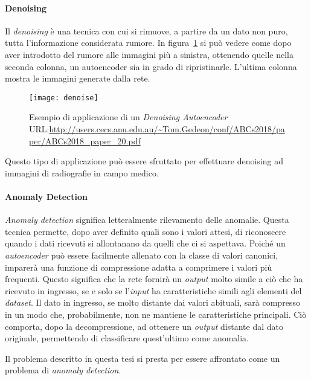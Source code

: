 \paragraph{Denoising}
Il \textit{denoising} è una tecnica con cui si rimuove, a partire da un dato non puro, tutta l'informazione considerata rumore.
In figura~\ref{fig:denoise_example} si può vedere come dopo aver introdotto del rumore alle immagini più a sinistra, ottenendo quelle nella seconda colonna, un autoencoder sia in grado di ripristinarle.
L'ultima colonna mostra le immagini generate dalla rete.
\begin{figure}[ht]
  \begin{center}
    \texttt{[image: denoise]}
  \end{center}
  \caption{Esempio di applicazione di un \textit{Denoising Autoencoder} URL:\url{http://users.cecs.anu.edu.au/~Tom.Gedeon/conf/ABCs2018/paper/ABCs2018_paper_20.pdf}}
  \label{fig:denoise_example}
\end{figure}
Questo tipo di applicazione può essere sfruttato per effettuare denoising ad immagini di radiografie in campo medico.


\paragraph{Anomaly Detection}
\textit{Anomaly detection} significa letteralmente rilevamento delle anomalie.
Questa tecnica permette, dopo aver definito quali sono i valori attesi, di riconoscere quando i dati ricevuti si allontanano da quelli che ci si aspettava.
Poiché un \textit{autoencoder} può essere facilmente allenato con la classe di valori canonici, imparerà una funzione di compressione adatta a comprimere i valori più frequenti.
Questo significa che la rete fornirà un \textit{output} molto simile a ciò che ha ricevuto in ingresso, se e solo se l'\textit{input} ha caratteristiche simili agli elementi del \textit{dataset}.
Il dato in ingresso, se molto distante dai valori abituali, sarà compresso in un modo che, probabilmente, non ne mantiene le caratteristiche principali.
Ciò comporta, dopo la decompressione, ad ottenere un \textit{output} distante dal dato originale, permettendo di classificare quest'ultimo come anomalia.

Il problema descritto in questa tesi si presta per essere affrontato come un problema di \textit{anomaly detection}.
